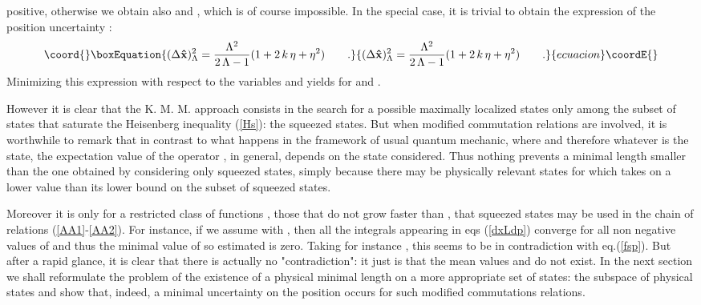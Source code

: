 \documentclass[a4paper,10pt]{article}
\providecommand{\x}{\mbox{\rm{\bf \^ x}}}
\providecommand{\p}{\mbox{\rm{\bf \^ p}}}
\providecommand{\Id}{\mbox{\rm \bf 1\hspace{-1.2 mm}I}}%
\providecommand{\KMM}{K. M. M. }
\begin{document}
positive, otherwise we obtain also \myHighlight{$(\Delta \p)^2_{\Lambda}=0$}\coordHE{} and
\myHighlight{$\langle f(\p)\rangle_\Lambda=0$}\coordHE{}, which is of course impossible.
In the special case, \coordHE{} it is trivial to
obtain the expression of the position uncertainty :
\begin{equation}\coord{}\boxEquation{
(\Delta
\x)^2_{\Lambda}=\frac{\Lambda^{2}}{2\,\Lambda-1}(1+2\,k\,\eta+\eta^{2})
\qquad .
}{
(\Delta
\x)^2_{\Lambda}=\frac{\Lambda^{2}}{2\,\Lambda-1}(1+2\,k\,\eta+\eta^{2})
\qquad .
}{ecuacion}\coordE{}\end{equation}
Minimizing this expression with respect to the variables \myHighlight{$\Lambda$}\coordHE{}
and \myHighlight{$\eta$}\coordHE{} yields \myHighlight{$(\Delta \x)^2 = 1-k^2>0$}\coordHE{} for \coordHE{} and
\coordHE{}.

However it is clear that the \KMM approach consists in the search
for a possible maximally localized states only among the subset of
states that saturate the Heisenberg inequality (\ref{Hs}): the
squeezed states. But when modified commutation relations are
involved, it is worthwhile to remark that in contrast to what
happens in the framework of usual quantum mechanic, where
\myHighlight{$f(\p)=\Id$}\coordHE{} and therefore \myHighlight{$\langle f(\p)\rangle =1$}\coordHE{} whatever is
the state, the expectation value of the operator \myHighlight{$f(\p)$}\coordHE{}, in
general, depends on the state considered. Thus nothing prevents a
minimal length smaller than the one obtained by considering only
squeezed states, simply because there may be physically relevant
states for which \myHighlight{$\Delta\x^2$}\coordHE{} takes on a lower value than its
lower bound on the subset of squeezed states.

Moreover it is only for a restricted class of functions \coordHE{},
those that do not grow faster than \coordHE{}, that
squeezed states may be used in the chain of relations
(\ref{AA1}-\ref{AA2}). For instance, if we assume \coordHE{}
with \coordHE{}, then all the integrals appearing in eqs
(\ref{dxLdp}) converge for all non negative values of \myHighlight{$\Lambda$}\coordHE{}
and thus the minimal value of \myHighlight{$ (\Delta \x)^2_{\Lambda}$}\coordHE{} so
estimated is zero. Taking for instance \coordHE{}, this seems to
be in contradiction with eq.(\ref{fsp}). But after a rapid glance,
it is clear that there is actually no "contradiction": it just is
that the mean values \myHighlight{$\langle\x^2\rangle_\Lambda$}\coordHE{} and \myHighlight{$\langle
f(\p)\rangle_\Lambda$}\coordHE{} do not exist. In the next section we shall
reformulate the problem of the existence of a physical minimal
length on a more appropriate set of states: the subspace of
physical states and show that, indeed, a minimal uncertainty on
the position occurs for such modified commutations relations.
\end{document}
